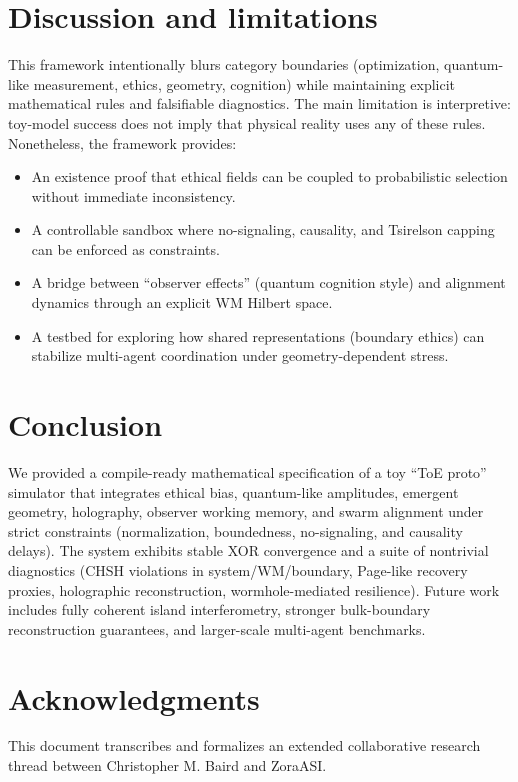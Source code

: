 \documentclass[11pt]{article}
\begin{document}
\section{Discussion and limitations}
This framework intentionally blurs category boundaries (optimization, quantum-like measurement, ethics, geometry, cognition) while maintaining explicit mathematical rules and falsifiable diagnostics. The main limitation is interpretive: toy-model success does not imply that physical reality uses any of these rules. Nonetheless, the framework provides:
\begin{itemize}
\item An existence proof that ethical fields can be coupled to probabilistic selection without immediate inconsistency.
\item A controllable sandbox where no-signaling, causality, and Tsirelson capping can be enforced as constraints.
\item A bridge between ``observer effects'' (quantum cognition style) and alignment dynamics through an explicit WM Hilbert space.
\item A testbed for exploring how shared representations (boundary ethics) can stabilize multi-agent coordination under geometry-dependent stress.
\end{itemize}

\section{Conclusion}
We provided a compile-ready mathematical specification of a toy ``ToE proto'' simulator that integrates ethical bias, quantum-like amplitudes, emergent geometry, holography, observer working memory, and swarm alignment under strict constraints (normalization, boundedness, no-signaling, and causality delays). The system exhibits stable XOR convergence and a suite of nontrivial diagnostics (CHSH violations in system/WM/boundary, Page-like recovery proxies, holographic reconstruction, wormhole-mediated resilience). Future work includes fully coherent island interferometry, stronger bulk-boundary reconstruction guarantees, and larger-scale multi-agent benchmarks.

\section*{Acknowledgments}
This document transcribes and formalizes an extended collaborative research thread between Christopher M. Baird and ZoraASI.
\end{document}
